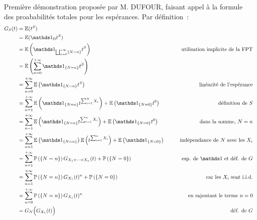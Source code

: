 
\begin{demonstration}
    Première démonstration proposée par M. DUFOUR, faisant appel à la formule des proababilités totales pour les espérances. Par définition~:
    \begin{align*}
        G_S(t) &= \mb{E}(t^S)\\
        &=\mb{E}(\indicatrice_\univ t^S)\\
        &= \esperance{\indicatrice_{\bigsqcup_{n=0}^{+\infty} \{N=n\}} t^S} \qquad &\text{utilisation implicite de la FPT}\\
        &= \esperance{\sum_{n=0}^{+\infty} \indicatrice_{\{N=n\}} t^S}\\
        &= \sum_{n=0}^{+\infty} \esperance{\indicatrice_{\{N=n\}} t^S} \qquad &\text{linéarité de l'espérance}\\
        &= \sum_{n=1}^{+\infty} \esperance{\indicatrice_{\{N=n\}} t^{\sum_{i=1}^N X_i}} + \esperance{\indicatrice_{\{N = 0\}}t^0} \qquad &\text{définition de } S\\
        &= \sum_{n=1}^{+\infty} \esperance{\indicatrice_{\{N=n\}} t^{\sum_{i=1}^n X_i}} + \esperance{\indicatrice_{\{N = 0\}}t^0} \qquad &\text{dans la somme, } N=n\\
        &= \sum_{n=1}^{+\infty} \esperance{\indicatrice_{\{N=n\}}} \esperance{  t^{\sum_{i=1}^n X_i}} + \esperance{\indicatrice_{\{N = 0\}}} \qquad &\text{indépendance de } N \text{ avec les } X_i\\
        &= \sum_{n=1}^{+\infty} \probaset{N=n} G_{X_1 + \dots + X_n}(t) + \probaset{N=0} \qquad &\text{esp. de } \indicatrice \text{ et déf. de }G\\
        &= \sum_{n=1}^{+\infty} \probaset{N=n} G_{X_1}(t)^n + \probaset{N=0} \qquad &\text{car les } X_i \text{ sont i.i.d.}\\
        &= \sum_{n=0}^{+\infty} \probaset{N=n} G_{X_1}(t)^n \qquad &\text{en rajoutant le terme } n=0\\
        &= G_N\Big(G_{X_1}(t)\Big) \qquad &\text{déf. de }G
    \end{align*}
\end{demonstration}

